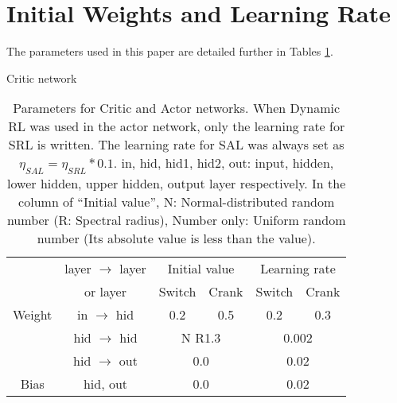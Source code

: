 \section{Initial Weights and Learning Rate}\label{App:Table}
The parameters used in this paper are detailed further in Tables \ref{Table:WeightsAndBiases}.
\begin{table}[h]
  \caption{Parameters for Critic and Actor networks.
  When Dynamic RL was used in the actor network, only the learning rate for SRL is written.
  The learning rate for SAL was always set as $\eta_{SAL} = \eta_{SRL}*0.1$.
  in, hid, hid1, hid2, out: input, hidden, lower hidden, upper hidden, output layer respectively.
  In the column of ``Initial value'', N: Normal-distributed random number (R: Spectral radius),
  Number only: Uniform random number (Its absolute value is less than the value).}
  \label{Table:WeightsAndBiases}
  \centering \small
  \vspace{5mm}
  Critic network\\
  \vspace{3mm}
   \begin{tabular}{cccccc}
  \hline
                       & layer $\rightarrow$ layer & \multicolumn{2}{c}{Initial value} & \multicolumn{2}{c}{Learning rate}\\
                       &  or layer                           & Switch & Crank & Switch & Crank\\                       
  \hline                     
  Weight & in $\rightarrow$ hid & 0.2 & 0.5 & 0.2 & 0.3\\
                       & hid $\rightarrow$ hid & \multicolumn{2}{c}{N R1.3} & \multicolumn{2}{c}{0.002}\\
                       & hid $\rightarrow$ out & \multicolumn{2}{c}{0.0} & \multicolumn{2}{c}{0.02}\\
  \hline
  Bias& hid, out & \multicolumn{2}{c}{0.0} & \multicolumn{2}{c}{0.02}\\
  \hline
  \end{tabular}
 

\end{table}
